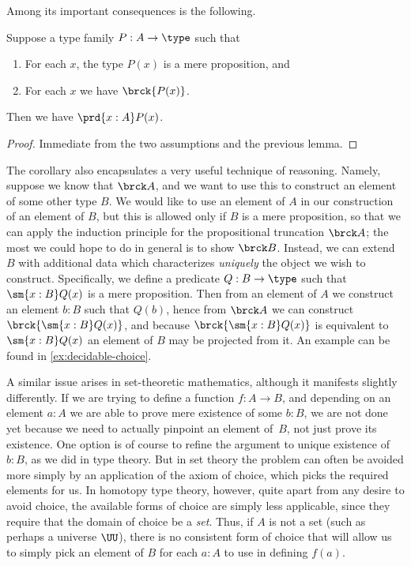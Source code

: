 Among its important consequences is the following.

\begin{cor}\label{cor:UC}
  Suppose a type family $P:A\to \type$ such that
  \begin{enumerate}
  \item For each $x$, the type $P(x)$ is a mere proposition, and
  \item For each $x$ we have $\brck {P(x)}$.
  \end{enumerate}
  Then we have $\prd{x:A} P(x)$.
\end{cor}
\begin{proof}
  Immediate from the two assumptions and the previous lemma.
\end{proof}

The corollary also encapsulates a very useful technique of reasoning.
Namely, suppose we know that $\brck A$, and we want to use this to construct an element of some other type $B$.
We would like to use an element of $A$ in our construction of an element of $B$, but this is allowed only if $B$ is a mere proposition, so that we can apply the induction principle for the propositional truncation $\brck A$; the most we could hope to do in general is to show $\brck B$.
%
Instead, we can extend $B$ with additional data which characterizes \emph{uniquely} the object we wish to construct.
Specifically, we define a predicate $Q:B\to\type$ such that $\sm{x:B} Q(x)$ is a mere proposition.
Then from an element of $A$ we construct an element $b:B$ such that $Q(b)$, hence from $\brck A$ we can construct $\brck{\sm{x:B} Q(x)}$, and because $\brck{\sm{x:B} Q(x)}$ is equivalent to $\sm{x:B} Q(x)$ an element of $B$ may be projected from it.
An example can be found in \cref{ex:decidable-choice}.

A similar issue arises in set-theoretic mathematics, although it manifests slightly
differently. If we are trying to define a function $f: A \to B$, and depending on an
element $a : A$ we are able to prove mere existence of some $b : B$, we are not done yet
because we need to actually pinpoint an element of~$B$, not just prove its existence.
One option is of course to refine the argument to unique existence of $b : B$, as we did in type theory. But in set theory the problem can often be avoided more simply by an application of the axiom of choice, which picks the required elements for us.
In homotopy type theory, however, quite apart from any desire to avoid choice, the available forms of choice are simply less applicable, since they require that the domain of choice be a \emph{set}.
Thus, if $A$ is not a set (such as perhaps a universe $\UU$), there is no consistent form of choice that will allow us to simply pick an element of $B$ for each $a : A$ to use in defining $f(a)$.

%

